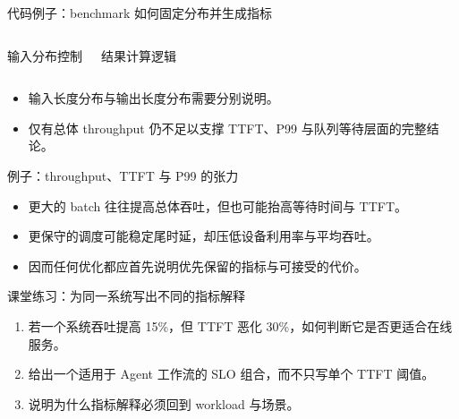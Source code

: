 \begin{frame}{代码例子：benchmark 如何固定分布并生成指标}
  \begin{columns}[T,totalwidth=\textwidth]
    \begin{block}{输入分布控制}
      {\ttfamily\small
      \par
      \par
      \par
      }
    \end{block}
    \begin{block}{结果计算逻辑}
      {\ttfamily\small
      \par
      \par
      \par
      }
    \end{block}
  \end{columns}
  \vspace{0.4em}
  \begin{itemize}
    \item 输入长度分布与输出长度分布需要分别说明。
    \item 仅有总体 throughput 仍不足以支撑 TTFT、P99 与队列等待层面的完整结论。
  \end{itemize}
\end{frame}

\begin{frame}{例子：throughput、TTFT 与 P99 的张力}
  \begin{itemize}
    \item 更大的 batch 往往提高总体吞吐，但也可能抬高等待时间与 TTFT。
    \item 更保守的调度可能稳定尾时延，却压低设备利用率与平均吞吐。
    \item 因而任何优化都应首先说明优先保留的指标与可接受的代价。
  \end{itemize}
\end{frame}

\begin{frame}{课堂练习：为同一系统写出不同的指标解释}
  \begin{enumerate}
    \item 若一个系统吞吐提高 15\%，但 TTFT 恶化 30\%，如何判断它是否更适合在线服务。
    \item 给出一个适用于 Agent 工作流的 SLO 组合，而不只写单个 TTFT 阈值。
    \item 说明为什么指标解释必须回到 workload 与场景。
  \end{enumerate}
\end{frame}
